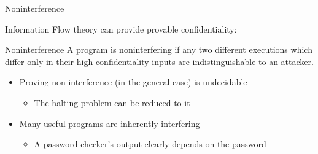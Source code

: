 \begin{frame}{Noninterference}
	
	Information Flow theory can provide provable confidentiality:
	\begin{block}{Noninterference}
		A program is noninterfering if any two different executions which differ only in their high confidentiality inputs are indistinguishable to an attacker. \cite{ifbackground:goguen}
	\end{block}
	\begin{itemize}
		\item Proving non-interference (in the general case) is undecidable
			\begin{itemize}
				\item The halting problem can be reduced to it
			\end{itemize}
		\item Many useful programs are inherently interfering
			\begin{itemize}
				\item A password checker's output clearly depends on the password
			\end{itemize}
	\end{itemize}
\end{frame}

%	

